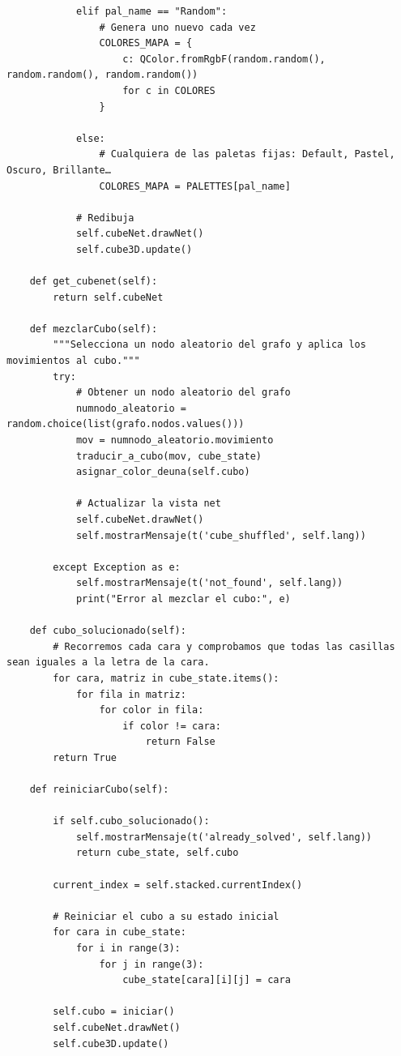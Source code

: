 \begin{lstlisting}
            elif pal_name == "Random":
                # Genera uno nuevo cada vez
                COLORES_MAPA = {
                    c: QColor.fromRgbF(random.random(), random.random(), random.random())
                    for c in COLORES
                }

            else:
                # Cualquiera de las paletas fijas: Default, Pastel, Oscuro, Brillante…
                COLORES_MAPA = PALETTES[pal_name]

            # Redibuja
            self.cubeNet.drawNet()
            self.cube3D.update()
    
    def get_cubenet(self):
        return self.cubeNet
    
    def mezclarCubo(self):
        """Selecciona un nodo aleatorio del grafo y aplica los movimientos al cubo."""
        try:
            # Obtener un nodo aleatorio del grafo
            numnodo_aleatorio = random.choice(list(grafo.nodos.values()))
            mov = numnodo_aleatorio.movimiento
            traducir_a_cubo(mov, cube_state)
            asignar_color_deuna(self.cubo)

            # Actualizar la vista net
            self.cubeNet.drawNet()
            self.mostrarMensaje(t('cube_shuffled', self.lang))
            
        except Exception as e:
            self.mostrarMensaje(t('not_found', self.lang))
            print("Error al mezclar el cubo:", e)
            
    def cubo_solucionado(self):
        # Recorremos cada cara y comprobamos que todas las casillas sean iguales a la letra de la cara.
        for cara, matriz in cube_state.items():
            for fila in matriz:
                for color in fila:
                    if color != cara:
                        return False
        return True
    
    def reiniciarCubo(self):
        
        if self.cubo_solucionado():
            self.mostrarMensaje(t('already_solved', self.lang))
            return cube_state, self.cubo
        
        current_index = self.stacked.currentIndex() 
        
        # Reiniciar el cubo a su estado inicial
        for cara in cube_state:
            for i in range(3):
                for j in range(3):
                    cube_state[cara][i][j] = cara
        
        self.cubo = iniciar()
        self.cubeNet.drawNet()
        self.cube3D.update()
        

\end{lstlisting}
